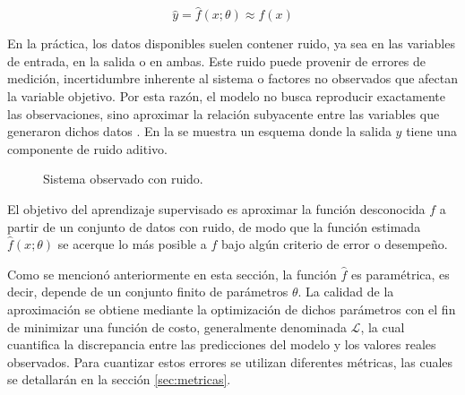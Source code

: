 \begin{equation}
    \label{eq:system_approximation}
    \hat{y} = \hat{f}(x; \theta) \approx f(x)
\end{equation}

En la práctica, los datos disponibles suelen contener ruido, ya sea en las variables de entrada, en la salida o en ambas. Este ruido puede provenir de errores de medición, incertidumbre inherente al sistema o factores no observados que afectan la variable objetivo. Por esta razón, el modelo no busca reproducir exactamente las observaciones, sino aproximar la relación subyacente entre las variables que generaron dichos datos \cite{Bishop2006}. En la  se muestra un esquema donde la salida $y$ tiene una componente de ruido aditivo.

\begin{figure}[H]
    \centering
    \caption{Sistema observado con ruido.}
    \label{fig:system_noise}
\end{figure}

El objetivo del aprendizaje supervisado es aproximar la función desconocida $f$ a partir de un conjunto de datos con ruido, de modo que la función estimada $\hat{f}(x; \theta)$ se acerque lo más posible a $f$ bajo algún criterio de error o desempeño.

Como se mencionó anteriormente en esta sección, la función $\hat{f}$ es paramétrica, es decir, depende de un conjunto finito de parámetros $\theta$. La calidad de la aproximación se obtiene mediante la optimización de dichos parámetros con el fin de minimizar una función de costo, generalmente denominada $\mathcal{L}$, la cual cuantifica la discrepancia entre las predicciones del modelo y los valores reales observados. Para cuantizar estos errores se utilizan diferentes métricas, las cuales se detallarán en la sección \ref{sec:metricas}.

